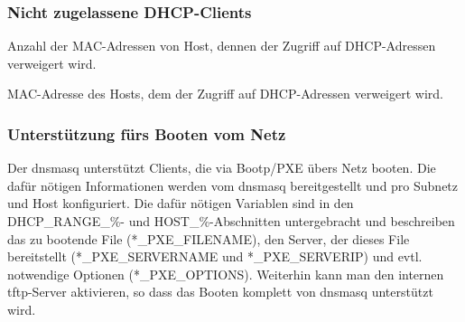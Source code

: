 \subsubsection{Nicht zugelassene DHCP-Clients}
\begin{description}

    {Anzahl der MAC-Adressen von Host, dennen der Zugriff auf DHCP-Adressen verweigert wird.}


    {MAC-Adresse des Hosts, dem der Zugriff auf DHCP-Adressen verweigert wird.}

  \end{description}

  \subsubsection{Unterstützung fürs Booten vom Netz}

  Der dnsmasq unterstützt Clients, die via Bootp/PXE übers Netz
  booten. Die dafür nötigen Informationen werden vom dnsmasq
  bereitgestellt und pro Subnetz und Host konfiguriert. Die dafür
  nötigen Variablen sind in den DHCP\_RANGE\_\%- und
  HOST\_\%-Abschnitten untergebracht und beschreiben das zu bootende
  File (*\_PXE\_FILENAME), den Server, der dieses File bereitstellt
  (*\_PXE\_SERVERNAME und *\_PXE\_SERVERIP) und evtl. notwendige
  Optionen (*\_PXE\_OPTIONS). Weiterhin kann man den internen
  tftp-Server aktivieren, so dass das Booten komplett von dnsmasq
  unterstützt wird.

